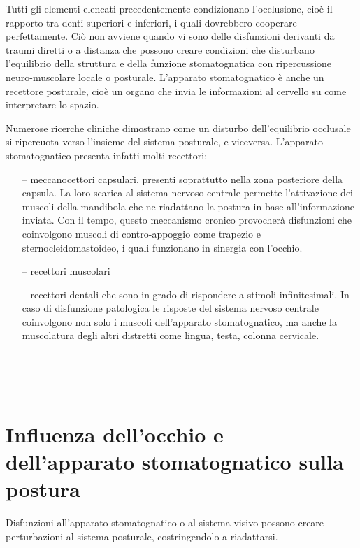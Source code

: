 Tutti gli elementi elencati precedentemente condizionano l’occlusione, cioè il rapporto tra denti superiori e inferiori, i quali dovrebbero cooperare perfettamente. Ciò non avviene quando vi sono delle disfunzioni derivanti da traumi diretti o a distanza che possono creare condizioni che disturbano l’equilibrio della struttura e della funzione stomatognatica con ripercussione neuro-muscolare locale o posturale. L’apparato stomatognatico è anche un recettore posturale, cioè un organo che invia le informazioni al cervello su come interpretare lo spazio. 

Numerose ricerche cliniche dimostrano come un disturbo dell’equilibrio occlusale si ripercuota verso l’insieme del sistema posturale, e viceversa. 
L’apparato stomatognatico presenta infatti molti recettori:
\begin{itemize}
 \itemsep-0.5em 
 \item[--]meccanocettori capsulari, presenti soprattutto nella zona posteriore della capsula. La loro scarica al sistema nervoso centrale permette l’attivazione dei muscoli della mandibola che ne riadattano la postura in base all’informazione inviata. Con il tempo, questo meccanismo cronico provocherà disfunzioni che coinvolgono muscoli di contro-appoggio come trapezio e sternocleidomastoideo, i quali funzionano in sinergia con l’occhio.
 \item[--]recettori muscolari
 \item[--]recettori dentali che sono in grado di rispondere a stimoli infinitesimali. In caso di disfunzione patologica le risposte del sistema nervoso centrale coinvolgono non solo i muscoli dell’apparato stomatognatico, ma anche la muscolatura degli altri distretti come lingua, testa, colonna cervicale.
\end{itemize}
 
\\\ \\\
\section{Influenza dell’occhio e dell’apparato stomatognatico sulla postura}
 
Disfunzioni all’apparato stomatognatico o al sistema visivo possono creare perturbazioni al sistema posturale, costringendolo a riadattarsi. 

